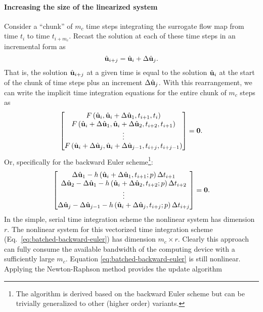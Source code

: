 \paragraph{Increasing the size of the linearized system}
Consider a ``chunk'' of $m_c$ time steps integrating the surrogate flow map from time $t_i$ to time $t_{i+m_c}$.  Recast the solution at each of these time steps in an incremental form as
\begin{equation}
    \hat{\textbf{u}}_{i+j} = \hat{\textbf{u}}_{i} + \Delta \hat{\textbf{u}}_j.
\end{equation}
That is, the solution $\hat{\textbf{u}}_{i+j}$ at a given time is equal to the solution $\hat{\textbf{u}}_i$ at the start of the chunk of time steps plus an increment $\Delta \hat{\textbf{u}}_j$.  With this rearrangement, we can write the implicit time integration equations for the entire chunk of $m_c$ steps as
\begin{equation}
    \begin{bmatrix}
    F\left(\hat{\textbf{u}}_{i}, \hat{\textbf{u}}_{i} + \Delta \hat{\textbf{u}}_{1}, t_{i+1}, t_{i}\right)\\ 
    F\left(\hat{\textbf{u}}_{i}+ \Delta \hat{\textbf{u}}_{1}, \hat{\textbf{u}}_{i} + \Delta \hat{\textbf{u}}_{2}, t_{i+2}, t_{i+1}\right)\\ 
    \vdots\\ 
    F\left(\hat{\textbf{u}}_{i} + \Delta \hat{\textbf{u}}_{j}, \hat{\textbf{u}}_{i} + \Delta \hat{\textbf{u}}_{j-1}, t_{i+j}, t_{i+j-1}\right)
    \end{bmatrix} = \boldsymbol{0}.
\end{equation}
Or, specifically for the backward Euler scheme\footnote{The algorithm is derived based on the backward Euler scheme but can be trivially generalized to other (higher order) variants.}:
\begin{equation}
    \begin{bmatrix}
    \Delta \hat{\textbf{u}}_{1} - h\left(\hat{\textbf{u}}_{i} + \Delta \hat{\textbf{u}}_{1}, t_{i+1}; p \right) \Delta t_{i+1}\\ 
    \Delta \hat{\textbf{u}}_{2} - \Delta \hat{\textbf{u}}_{1} - h\left(\hat{\textbf{u}}_{i} + \Delta \hat{\textbf{u}}_{2}, t_{i+2}; p \right) \Delta t_{i+2}\\ 
    \vdots\\ 
    \Delta \hat{\textbf{u}}_{j} - \Delta \hat{\textbf{u}}_{j-1} - h\left(\hat{\textbf{u}}_{i} + \Delta \hat{\textbf{u}}_{j}, t_{i+j}; p \right) \Delta t_{i+j}
    \end{bmatrix} = \boldsymbol{0}.
    \label{eq:batched-backward-euler}
\end{equation}
In the simple, serial time integration scheme the nonlinear system has dimension $r$.  The nonlinear system for this vectorized time integration scheme (Eq.~\ref{eq:batched-backward-euler}) has dimension $m_c \times r$.  Clearly this approach can fully consume the available bandwidth of the computing device with a sufficiently large $m_c$. Equation \ref{eq:batched-backward-euler} is still nonlinear.  Applying the Newton-Raphson method provides the update algorithm
